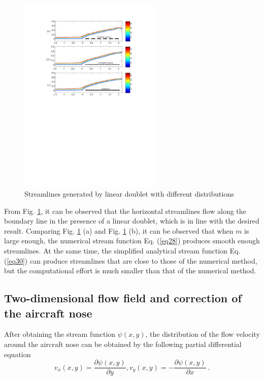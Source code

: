 \begin{figure}[th]
	\centering
	\includegraphics[width=0.6\textwidth]{Figures/Figs_Ch4/fig6.pdf}
	\caption{Streamlines generated by linear doublet with different distributions}\label{fig6}
\end{figure}

From Fig. \ref{fig6}, it can be observed that the horizontal streamlines flow along the boundary line in the presence of a linear doublet, which is in line with the desired result. Comparing Fig. \ref{fig6} (a) and Fig. \ref{fig6} (b), it can be observed that when $m$ is large enough, the numerical stream function Eq. (\ref{eq28}) produces smooth enough streamlines. At the same time, the simplified analytical stream function Eq. (\ref{eq30}) can produce streamlines that are close to those of the numerical method, but the computational effort is much smaller than that of the numerical method.

\subsection{Two-dimensional flow field and correction of the aircraft nose}
After obtaining the stream function $\psi \left( {x,y} \right)$, the distribution of the flow velocity around the aircraft nose can be obtained by the following partial differential equation\cite{rauscher1953introduction}
\begin{equation}\label{eq31}
v_x(x, y)=\frac{\partial \psi(x, y)}{\partial y}, v_y(x, y)=-\frac{\partial \psi(x, y)}{\partial x} \, .
\end{equation}

